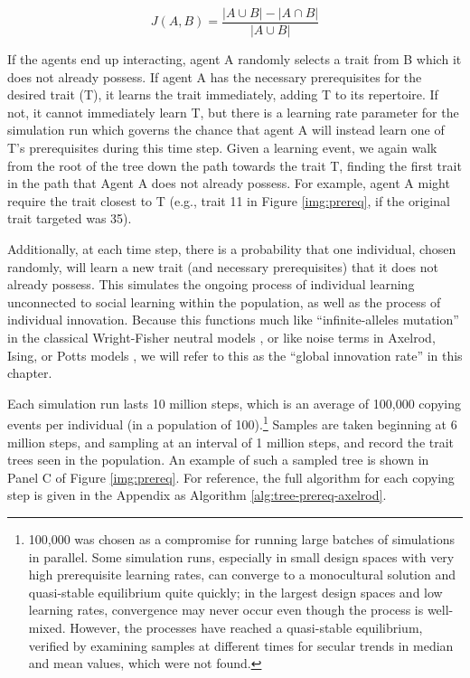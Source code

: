 \documentclass[graybox,natbib]{svmult}
\begin{document}
\begin{equation}J(A,B) = \frac{|A \cup B| - |A \cap B|}{|A \cup B|}\end{equation}

If the agents end up interacting, agent A randomly selects a trait from
B which it does not already possess. If agent A has the necessary
prerequisites for the desired trait (T), it learns the trait
immediately, adding T to its repertoire. If not, it cannot immediately
learn T, but there is a learning rate parameter for the simulation run
which governs the chance that agent A will instead learn one of T's
prerequisites during this time step. Given a learning event, we again
walk from the root of the tree down the path towards the trait T,
finding the first trait in the path that Agent A does not already
possess. For example, agent A might require the trait closest to T
(e.g., trait 11 in Figure \ref{img:prereq}, if the original trait
targeted was 35).

Additionally, at each time step, there is a probability that one
individual, chosen randomly, will learn a new trait (and necessary
prerequisites) that it does not already possess. This simulates the
ongoing process of individual learning unconnected to social learning
within the population, as well as the process of individual innovation.
Because this functions much like ``infinite-alleles mutation'' in the
classical Wright-Fisher neutral models \citep{Ewens2004}, or like noise
terms in Axelrod, Ising, or Potts models
\citep{castellano2009statistical}, we will refer to this as the
``global innovation rate'' in this chapter.

Each simulation run lasts 10 million steps, which is an average of
100,000 copying events per individual (in a population of
100).\footnote{100,000 was chosen as a compromise for running large
  batches of simulations in parallel. Some simulation runs, especially
  in small design spaces with very high prerequisite learning rates, can
  converge to a monocultural solution and quasi-stable equilibrium quite
  quickly; in the largest design spaces and low learning rates,
  convergence may never occur even though the process is well-mixed.
  However, the processes have reached a quasi-stable equilibrium,
  verified by examining samples at different times for secular trends in
  median and mean values, which were not found.} Samples are taken
beginning at 6 million steps, and sampling at an interval of 1 million
steps, and record the trait trees seen in the population. An example of
such a sampled tree is shown in Panel C of Figure \ref{img:prereq}. For
reference, the full algorithm for each copying step is given in the
Appendix as Algorithm \ref{alg:tree-prereq-axelrod}.
\end{document}
